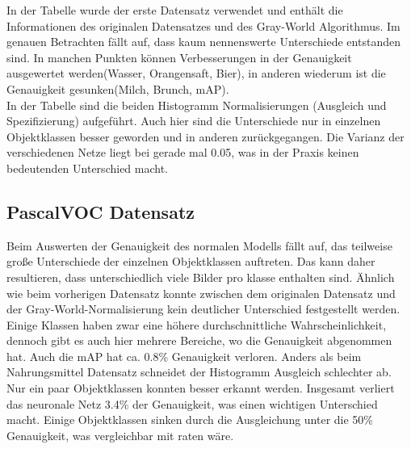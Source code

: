 \documentclass[a4paper,12pt,oneside]{article}
\begin{document}
In der Tabelle wurde der erste Datensatz verwendet und enthält die Informationen des originalen Datensatzes und des Gray-World Algorithmus. Im genauen Betrachten fällt auf, dass kaum nennenswerte Unterschiede entstanden sind. In manchen Punkten können Verbesserungen in der Genauigkeit ausgewertet werden(Wasser, Orangensaft, Bier), in anderen wiederum ist die Genauigkeit gesunken(Milch, Brunch, mAP).\\
In der Tabelle sind die beiden Histogramm Normalisierungen (Ausgleich und Spezifizierung) aufgeführt. Auch hier sind die Unterschiede nur in einzelnen Objektklassen besser geworden und in anderen zurückgegangen. Die Varianz der verschiedenen Netze liegt bei gerade mal 0.05, was in der Praxis keinen bedeutenden Unterschied macht.
  \subsection{PascalVOC Datensatz}
Beim Auswerten der Genauigkeit des normalen Modells fällt auf, das teilweise große Unterschiede der einzelnen Objektklassen auftreten. Das kann daher resultieren, dass unterschiedlich viele Bilder pro klasse enthalten sind. Ähnlich wie beim vorherigen Datensatz konnte zwischen dem originalen Datensatz und der Gray-World-Normalisierung kein deutlicher Unterschied festgestellt werden. Einige Klassen haben zwar eine höhere durchschnittliche Wahrscheinlichkeit, dennoch gibt es auch hier mehrere Bereiche, wo die Genauigkeit abgenommen hat. Auch die mAP hat ca. 0.8\% Genauigkeit verloren. Anders als beim Nahrungsmittel Datensatz schneidet der Histogramm Ausgleich schlechter ab. Nur ein paar Objektklassen konnten besser erkannt werden. Insgesamt verliert das neuronale Netz 3.4\% der Genauigkeit, was einen wichtigen Unterschied macht. Einige Objektklassen sinken durch die Ausgleichung unter die 50\% Genauigkeit, was vergleichbar mit raten wäre.
\end{document}

